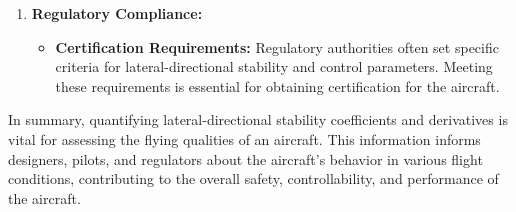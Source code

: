 \documentclass[a4paper, twoside]{article}
\begin{document}
\begin{enumerate}
    \item \textbf{Regulatory Compliance:}
    \begin{itemize}
        \item \textbf{Certification Requirements:} Regulatory authorities often set specific criteria for lateral-directional stability and control parameters. Meeting these requirements is essential for obtaining certification for the aircraft.
    \end{itemize}
\end{enumerate}

In summary, quantifying lateral-directional stability coefficients and derivatives is vital for assessing the flying qualities of an aircraft. This information informs designers, pilots, and regulators about the aircraft's behavior in various flight conditions, contributing to the overall safety, controllability, and performance of the aircraft.
\end{document}
